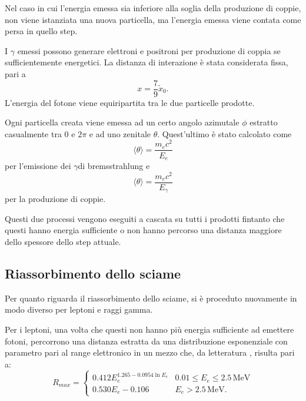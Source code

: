 \documentclass[10pt,a4paper,usenatbib]{article}
\newcommand*{\unit}[1]{\ensuremath{\mathrm{\,#1}}}                              %
\begin{document}
Nel caso in cui l'energia emessa sia inferiore alla soglia della produzione di coppie, non viene istanziata una nuova particella, ma l'energia emessa viene contata come persa in quello step.

\bigskip

I $\gamma$ emessi possono generare elettroni e positroni per produzione di coppia se sufficientemente energetici. La distanza di interazione è stata considerata fissa, pari a 
\begin{equation}
x = \frac{7}{9}\tilde{x}_0.
\end{equation}
L'energia del fotone viene equiripartita tra le due particelle prodotte.

Ogni particella creata viene emessa ad un certo angolo azimutale $\phi$ estratto casualmente tra 0 e $2\pi$ e ad uno zenitale $\theta$. Quest'ultimo  è stato calcolato come
\begin{equation}
\langle\theta\rangle = \frac{m_e c^2}{E_e}
\end{equation}
per l'emissione dei $\gamma$di bremsstrahlung e 
\begin{equation}
\langle\theta\rangle = \frac{m_e c^2}{E_\gamma}
\end{equation}
per la produzione di coppie. 

Questi due processi vengono eseguiti a cascata su tutti i prodotti fintanto che questi hanno energia sufficiente o non hanno percorso una distanza maggiore dello spessore dello step attuale.

\subsection{Riassorbimento dello sciame}
\label{subsec:riassorb}
Per quanto riguarda il riassorbimento dello sciame, si è proceduto nuovamente in modo diverso per leptoni e raggi gamma. 

Per i leptoni, una volta che questi non hanno più energia sufficiente ad emettere fotoni, percorrono una distanza estratta da una distribuzione esponenziale con parametro pari al range elettronico in un mezzo che, da letteratura \citep{RevModPhys.24.28}, risulta pari a: 
\begin{equation}
R_{max} = \begin{cases} 0.412 E_e^{1.265-0.0954 \ln{E_e}}     & 0.01\le E_e \le 2.5\unit{MeV} \\ 
                                          0.530 E_e - 0.106                                   & E_e > 2.5\unit{MeV}. 
                   \end{cases}
\end{equation}
\end{document}
